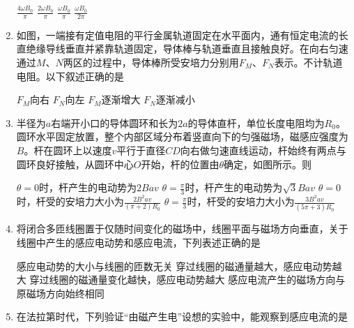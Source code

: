 \begin{enumerate}
\fourchoices
{$ \frac { 4 \omega B _ { 0 } } { \pi } $}
{$ \frac { 2 \omega B _ { 0 } } { \pi } $}
{$ \frac { \omega B _ { 0 } } { \pi } $}
{$ \frac { \omega B _ { 0 } } { 2 \pi } $}

\item 
{}
如图，一端接有定值电阻的平行金属轨道固定在水平面内，通有恒定电流的长直绝缘导线垂直并紧靠轨道固定，导体棒与轨道垂直且接触良好。在向右匀速通过$ M $、$ N $两区的过程中，导体棒所受安培力分别用$ F_M $、$ F_{N} $表示。不计轨道电阻。以下叙述正确的是  
\begin{figure}[h!]
\centering

\end{figure}




\fourchoices
{$ F_M $向右}
{$ F_{N} $向左 }
{$ F_M $逐渐增大}
{$ F_N $逐渐减小}




\item 
{}
半径为$ a $右端开小口的导体圆环和长为$ 2a $的导体直杆，单位长度电阻均为$ R_{0} $。圆环水平固定放置，整个内部区域分布着竖直向下的匀强磁场，磁感应强度为$ B $。杆在圆环上以速度$ v $平行于直径$ CD $向右做匀速直线运动，杆始终有两点与圆环良好接触，从圆环中心$ O $开始，杆的位置由$ \theta $确定，如图所示。则  
\begin{figure}[h!]
\centering

\end{figure}



\fourchoices
{$ \theta =0 $时，杆产生的电动势为$ 2Bav $}
{$ \theta =\frac{\pi}{3} $时，杆产生的电动势为$\sqrt { 3 } B a v$}
{$ \theta =0 $时，杆受的安培力大小为$\frac { 2 B ^ { 2 } a v } { ( \pi + 2 ) R _ { 0 } }$}
{$ \theta =\frac{\pi}{3} $时，杆受的安培力大小为$\frac { 3 B ^ { 2 } a v } { ( 5 \pi + 3 ) R _ { 0 } }$}




\item 
{}
将闭合多匝线圈置于仅随时间变化的磁场中，线圈平面与磁场方向垂直，关于线圈中产生的感应电动势和感应电流，下列表述正确的是  


\fourchoices
{感应电动势的大小与线圈的匝数无关}
{穿过线圈的磁通量越大，感应电动势越大}
{穿过线圈的磁通量变化越快，感应电动势越大}
{感应电流产生的磁场方向与原磁场方向始终相同}





\item 
{}
在法拉第时代，下列验证“由磁产生电”设想的实验中，能观察到感应电流的是  



\end{enumerate}
